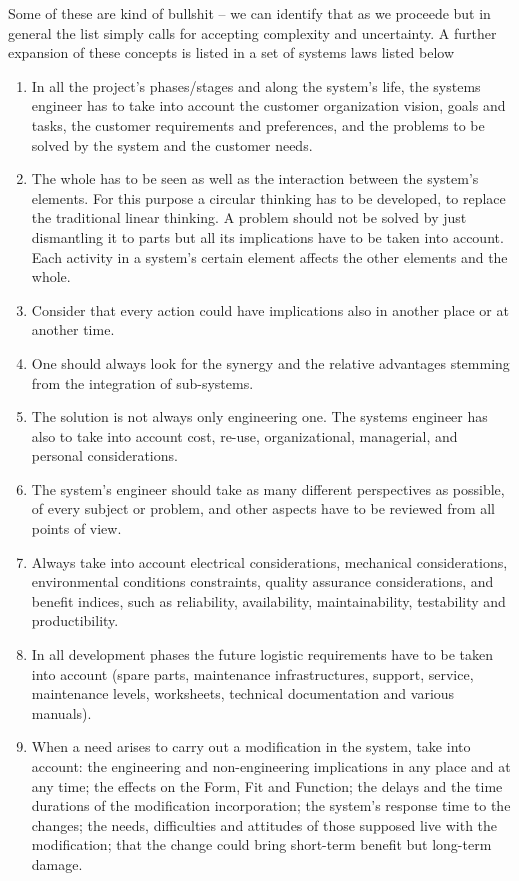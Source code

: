 \documentclass[11pt]{article}
\begin{document}
Some of these are kind of bullshit -- we can identify that as we proceede but in general the list simply  calls for accepting complexity and uncertainty.
A further expansion of these concepts is listed in a set of systems laws \citep{Frank2002} listed below
\begin{enumerate}
\item In all the project's phases/stages and along the system's life, the systems engineer has to take into account the customer organization vision, goals and tasks, the customer requirements and preferences, and the problems to be solved by the system and the customer needs.
\item The whole has to be seen as well as the interaction between the system's elements. For this purpose a circular thinking has to be developed, to replace the traditional linear thinking. A problem should not be solved by just dismantling it to parts but all its implications have to be taken into account. Each activity in a system's certain element affects the other elements and the whole.
\item Consider that every action could have implications also in another place or at another time.
\item One should always look for the synergy and the relative advantages stemming from the integration of sub-systems.
\item The solution is not always only engineering one. The systems engineer has also to take into account cost, re-use, organizational, managerial, and personal considerations.
\item The system's engineer should take as many different perspectives as possible, of every subject or problem, and other aspects have to be reviewed from all points of view.
\item Always take into account electrical considerations, mechanical considerations, environmental conditions constraints, quality assurance considerations, and benefit indices, such as reliability, availability, maintainability, testability and productibility.
\item In all development phases the future logistic requirements have to be taken into account (spare parts, maintenance infrastructures, support, service, maintenance levels, worksheets, technical documentation and various manuals).
\item When a need arises to carry out a modification in the system, take into account: the engineering and non-engineering implications in any place and at any time; the effects on the Form, Fit and Function; the delays and the time durations of the modification incorporation; the system's response time to the changes; the needs, difficulties and attitudes of those supposed live with the modification; that the change could bring short-term benefit but long-term damage.

\end{enumerate}
\end{document}
